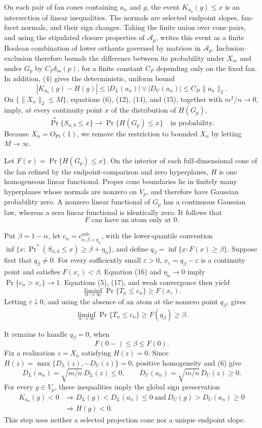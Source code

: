 On each pair of fan cones containing \(a_n\) and \(g\), the event \(K_{a_n}(g)\leq x\) is an intersection of linear inequalities.  The normals are selected endpoint slopes, fan-facet normals, and their sign changes.  Taking the finite union over cone pairs, and using the stipulated closure properties of \(\mathcal A_p\), writes this event as a finite Boolean combination of lower orthants governed by matrices in \(\mathcal A_p\).  Inclusion--exclusion therefore bounds the difference between its probability under \(X_m\) and under \(G_p\) by \(C_F\delta_m(p)\), for a finite constant \(C_F\) depending only on the fixed fan.  In addition, (4) gives the deterministic, uniform bound
\[
|K_{a_n}(g)-H(g)|
\leq |D_L(a_n)|\vee|D_U(a_n)|
\leq C_D\|a_n\|_2.
\tag{15}
\]
On \(\{\|X_n\|_2\leq M\}\), equations (6), (12), (14), and (15), together with \(m^2/n\to0\), imply, at every continuity point \(x\) of the distribution of \(H(G_p)\),
\[
\Pr^*\{S_{n,b}\leq x\}\longrightarrow
\Pr\{H(G_p)\leq x\}
\quad\text{in probability}.
\tag{16}
\]
Because \(X_n=O_{\Pr}(1)\), we remove the restriction to bounded \(X_n\) by letting \(M\to\infty\).

Let \(F(x)=\Pr\{H(G_p)\leq x\}\).  On the interior of each full-dimensional cone of the fan refined by the endpoint-comparison and zero hyperplanes, \(H\) is one homogeneous linear functional.  Proper cone boundaries lie in finitely many hyperplanes whose normals are nonzero on \(V_p\), and therefore have Gaussian probability zero.  A nonzero linear functional of \(G_p\) has a continuous Gaussian law, whereas a zero linear functional is identically zero.  It follows that
\[
F\text{ can have an atom only at }0.
\tag{17}
\]

Put \(\beta=1-\alpha\), let \(c_n=c^{\mathrm{sub}}_{n,\beta+\eta_n}\), with the lower-quantile convention \(\inf\{x:\Pr^*(S_{n,b}\leq x)\geq\beta+\eta_n\}\), and define \(q_\beta=\inf\{x:F(x)\geq\beta\}\).  Suppose first that \(q_\beta\neq0\).  For every sufficiently small \(\varepsilon>0\), \(x_\varepsilon=q_\beta-\varepsilon\) is a continuity point and satisfies \(F(x_\varepsilon)<\beta\).  Equation (16) and \(\eta_n\to0\) imply \(\Pr\{c_n>x_\varepsilon\}\to1\).  Equations (5), (17), and weak convergence then yield
\[
\liminf_{n\to\infty}\Pr\{T_n\leq c_n\}\geq F(x_\varepsilon).
\]
Letting \(\varepsilon\downarrow0\), and using the absence of an atom at the nonzero point \(q_\beta\), gives
\[
\liminf_{n\to\infty}\Pr\{T_n\leq c_n\}\geq F(q_\beta)\geq\beta.
\tag{18}
\]

It remains to handle \(q_\beta=0\), when
\[
F(0-)\leq\beta\leq F(0).
\tag{19}
\]
Fix a realization \(z=X_n\) satisfying \(H(z)=0\).  Since \(H(z)=\max\{D_L(z),-D_U(z)\}=0\), positive homogeneity and (6) give
\[
D_L(a_n)=\sqrt{m/n}\,D_L(z)\leq0,
\qquad
D_U(a_n)=\sqrt{m/n}\,D_U(z)\geq0.
\tag{20}
\]
For every \(g\in V_p\), these inequalities imply the global sign preservation
\[
\begin{aligned}
K_{a_n}(g)<0
&\Longrightarrow D_L(g)<D_L(a_n)\leq0
\ \text{and}\ D_U(g)>D_U(a_n)\geq0\\
&\Longrightarrow H(g)<0.
\end{aligned}
\tag{21}
\]
This step uses neither a selected projection cone nor a unique endpoint slope.

